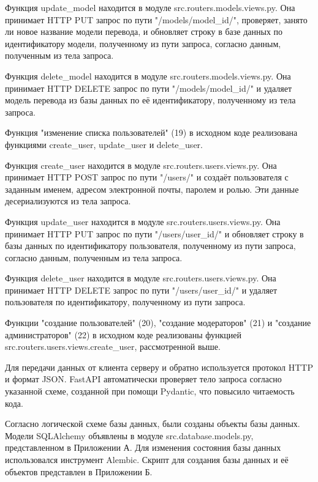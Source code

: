Функция update\_model находится в модуле src.routers.models.views.py. Она принимает HTTP PUT запрос по пути "/models/{model\_id}/", проверяет, занято ли новое название модели перевода, и обновляет строку в базе данных по идентификатору модели, полученному из пути запроса, согласно данным, полученным из тела запроса.

Функция delete\_model находится в модуле src.routers.models.views.py. Она принимает HTTP DELETE запрос по пути "/models/{model\_id}/" и удаляет модель перевода из базы данных по её идентификатору, полученному из тела запроса.


Функция "изменение списка пользователей" (19) в исходном коде реализована функциями create\_user, update\_user и delete\_user.

Функция create\_user находится в модуле src.routers.users.views.py. Она принимает HTTP POST запрос по пути "/users/" и создаёт пользователя с заданным именем, адресом электронной почты, паролем и ролью. Эти данные десериализуются из тела запроса.

Функция update\_user находится в модуле src.routers.users.views.py. Она принимает HTTP PUT запрос по пути "/users/{user\_id}/" и обновляет строку в базы данных по идентификатору пользователя, полученному из пути запроса, согласно данным, полученным из тела запроса.

Функция delete\_user находится в модуле src.routers.users.views.py. Она принимает HTTP DELETE запрос по пути "/users/{user\_id}/" и удаляет пользователя по идентификатору, полученному из пути запроса.

Функции "создание пользователей" (20), "создание модераторов" (21) и "создание администраторов" (22) в исходном коде реализованы функцией src.routers.users.views.create\_user, рассмотренной выше.

Для передачи данных от клиента серверу и обратно используется протокол HTTP и формат JSON. FastAPI автоматически проверяет тело запроса согласно указанной схеме, созданной при помощи Pydantic, что повысило читаемость кода.


Согласно логической схеме базы данных, были созданы объекты базы данных. Модели SQLAlchemy объявлены в модуле src.database.models.py, представленном в Приложении А. Для изменения состояния базы данных использовался инструмент Alembic. Скрипт для создания базы данных и её объектов представлен в Приложении Б.

